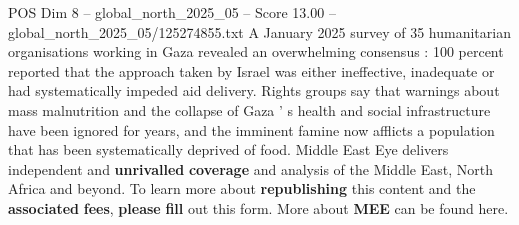 \begin{textsample}{POS Dim 8 – global\_north\_2025\_05 – Score 13.00 – global\_north\_2025\_05/125274855.txt}
A January 2025 survey of 35 humanitarian organisations working in Gaza revealed an overwhelming consensus : 100 percent reported that the approach taken by Israel was either ineffective, inadequate or had systematically impeded aid delivery.
Rights groups say that warnings about mass malnutrition and the collapse of Gaza ' s health and social infrastructure have been ignored for years, and the imminent famine now afflicts a population that has been systematically deprived of food.
Middle East Eye delivers independent and \textbf{unrivalled} \textbf{coverage} and analysis of the Middle East, North Africa and beyond.
To learn more about \textbf{republishing} this content and the \textbf{associated} \textbf{fees}, \textbf{please} \textbf{fill} out this form.
More about \textbf{MEE} can be found here.

\end{textsample}
